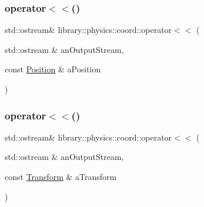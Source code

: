 \subsubsection{\texorpdfstring{operator$<$$<$()}{operator<<()}\hspace{0.1cm}{\footnotesize\ttfamily [4/5]}}
{\footnotesize\ttfamily std\+::ostream\& library\+::physics\+::coord\+::operator$<$$<$ (\begin{DoxyParamCaption}\item[{std\+::ostream \&}]{an\+Output\+Stream,  }\item[{const \hyperlink{classlibrary_1_1physics_1_1coord_1_1_position}{Position} \&}]{a\+Position }\end{DoxyParamCaption})}

\mbox{\label{namespacelibrary_1_1physics_1_1coord_ad6bcffb8bfa72e58047397a14d6785a4}} 
\subsubsection{\texorpdfstring{operator$<$$<$()}{operator<<()}\hspace{0.1cm}{\footnotesize\ttfamily [5/5]}}
{\footnotesize\ttfamily std\+::ostream\& library\+::physics\+::coord\+::operator$<$$<$ (\begin{DoxyParamCaption}\item[{std\+::ostream \&}]{an\+Output\+Stream,  }\item[{const \hyperlink{classlibrary_1_1physics_1_1coord_1_1_transform}{Transform} \&}]{a\+Transform }\end{DoxyParamCaption})}

